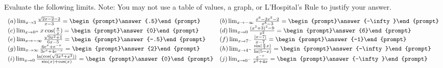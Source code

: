 \documentclass{ximera}
\author{Tom Dinitz and Nela Lakos}
\begin{document}
\begin{exercise}

  Evaluate the following limits. Note: You may not use a table of values, a graph,
  or L'Hospital's Rule to justify your answer.
\[
\begin{array}{l l}
  (a) \lim_{x\to 3} \frac{\sqrt{2x-2}-2}{x-3}=\begin{prompt}\answer{.5}\end{prompt}
	&
  (b) \lim_{x\to -\infty} \frac{x^6-2x^5-2}{x^5-3}=\begin{prompt}\answer{-\infty}\end{prompt} \\
  (c) \lim_{x\to 0^+} x\cos(\frac{\pi}{x})=\begin{prompt}\answer{0}\end{prompt} &
  (d) \lim_{x\to 0} \frac{(x^2+3)^2-9}{x^2}=\begin{prompt}\answer{6}\end{prompt}\\
  (e) \lim_{x\to -\infty} \frac{\sqrt{9x^2+1}}{6x-5}=\begin{prompt}\answer{-.5}\end{prompt} &
  (f) \lim_{x\to 7^-} \frac{|x-7|}{x-7}=\begin{prompt}\answer{-1}\end{prompt}\\
  (g) \lim_{x\to \infty} \frac{6e^x+e^{-x}}{3e^x+4e^{-x}}=\begin{prompt}\answer{2}\end{prompt}&
  (h) \lim_{x\to 4^-} \frac{\sin(\frac{\pi}{3}x)}{\ln(5-x)}=\begin{prompt}\answer{-\infty}\end{prompt}\\
  (i) \lim_{x\to 0} \frac{\ln(\cos(\sqrt{3x^4+x^2}))}{\sin(x)+\cos(x)}=\begin{prompt}\answer{0}\end{prompt}
&
  (j) \lim_{x\to 0^-} \frac{e^{-x}}{x^2+4x}=\begin{prompt}\answer{-\infty}\end{prompt}
\end{array}
\]
\end{exercise}
\end{document}
